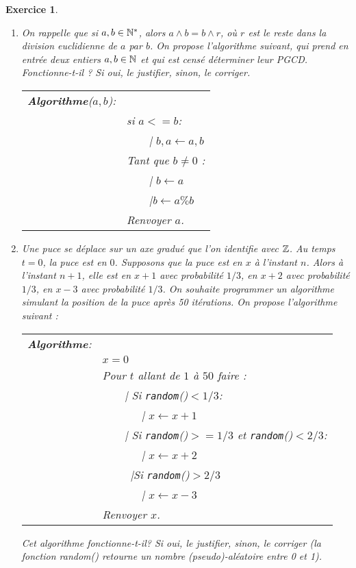 \documentclass[11pt,a4paper]{article}
\newtheorem{ex}{Exercice}
\begin{document}
 
\begin{ex}\label{exLecture}

\begin{enumerate}
\item On rappelle que si $a,b\in \mathbb{N}^*$, alors $a\wedge b=b\wedge r$, où $r$ est le reste dans la division euclidienne de $a$ par $b$.  On propose l'algorithme suivant, qui prend en entrée deux entiers $a,b\in \mathbb{N}$   et qui est censé déterminer leur PGCD. Fonctionne-t-il ? Si oui, le justifier, sinon, le corriger.

 \begin{tabular}{ll}
\textbf{Algorithme}($a,b$):\\
& si $a<=b$:\\
&\ \ \ {\ \rm |} $b,a\leftarrow a,b$\\
& Tant que $b\neq 0$ :  \\
&\ \ \ {\ \rm |} $b \leftarrow a$ \\
&\ \ \  {\ \rm |}b$\leftarrow a\%b$ \\
& Renvoyer $a$. 
\end{tabular}

\item Une puce se déplace sur un axe gradué que l'on identifie avec $\mathbb{Z}$. Au temps $t=0$, la puce est en $0$. Supposons que la puce est en $x$ à l'instant $n$. Alors à l'instant $n+1$, elle est en $x+1$ avec probabilité $1/3$, en $x+2$ avec probabilité $1/3$, en $x-3$ avec probabilité $1/3$. On souhaite programmer un algorithme simulant la position de la puce après 50 itérations. On propose l'algorithme suivant : 

 \begin{tabular}{ll}
\textbf{Algorithme}:\\
& $x=0$ \\
& Pour $t$ allant de $1$ à $50$ faire :\\
&\ \ \ {\ \rm |} Si \texttt{random}()$<1/3$: \\
&\ \ \ \ \ \ {\ \rm |} $x\leftarrow x+1$\\
&\ \ \ {\ \rm |} Si \texttt{random}()$>=1/3$ et \texttt{random}()$<2/3$: \\
&\ \ \ \ \ \ {\ \rm |} $x\leftarrow x+2$\\
&\ \ \ \ {\ \rm |}Si \texttt{random}()$>2/3$ \\
&\ \ \ \ \ \ {\ \rm |} $x\leftarrow x-3$\\
& Renvoyer $x$. 
\end{tabular}

Cet algorithme fonctionne-t-il? Si oui, le justifier, sinon, le corriger (la fonction random() retourne un nombre (pseudo)-aléatoire entre 0 et 1).

\end{enumerate}

\end{ex}
\end{document}
